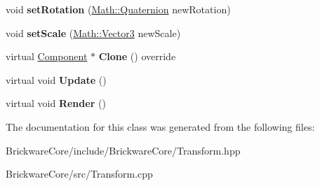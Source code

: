 \begin{DoxyCompactItemize}
\item 
\hypertarget{classBrickware_1_1Core_1_1Transform_a174ceb67c6026ea1571ef86d661048d1}{}void {\bfseries set\+Rotation} (\hyperlink{classBrickware_1_1Math_1_1Quaternion}{Math\+::\+Quaternion} new\+Rotation)\label{classBrickware_1_1Core_1_1Transform_a174ceb67c6026ea1571ef86d661048d1}

\item 
\hypertarget{classBrickware_1_1Core_1_1Transform_aab6c456f656812d283c13ca0e01cf25a}{}void {\bfseries set\+Scale} (\hyperlink{classBrickware_1_1Math_1_1Vector3}{Math\+::\+Vector3} new\+Scale)\label{classBrickware_1_1Core_1_1Transform_aab6c456f656812d283c13ca0e01cf25a}

\item 
\hypertarget{classBrickware_1_1Core_1_1Transform_a3c8be47482309465121da040787795af}{}virtual \hyperlink{classBrickware_1_1Core_1_1Component}{Component} $\ast$ {\bfseries Clone} () override\label{classBrickware_1_1Core_1_1Transform_a3c8be47482309465121da040787795af}

\item 
\hypertarget{classBrickware_1_1Core_1_1Transform_a3256c0fb53d0b341ad8d80fe61e5fb2d}{}virtual void {\bfseries Update} ()\label{classBrickware_1_1Core_1_1Transform_a3256c0fb53d0b341ad8d80fe61e5fb2d}

\item 
\hypertarget{classBrickware_1_1Core_1_1Transform_aff0bb59ec4e3b67259f6b168463d69f1}{}virtual void {\bfseries Render} ()\label{classBrickware_1_1Core_1_1Transform_aff0bb59ec4e3b67259f6b168463d69f1}

\end{DoxyCompactItemize}


The documentation for this class was generated from the following files\+:\begin{DoxyCompactItemize}
\item 
Brickware\+Core/include/\+Brickware\+Core/Transform.\+hpp\item 
Brickware\+Core/src/Transform.\+cpp\end{DoxyCompactItemize}
